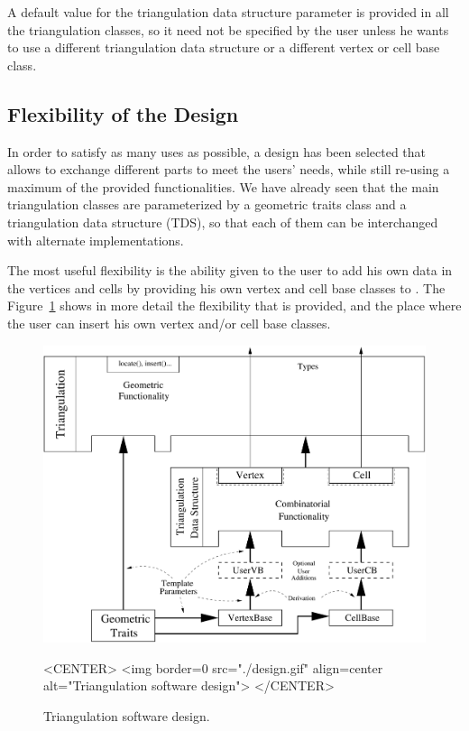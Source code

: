 A default value for the triangulation data structure parameter is provided in
all the triangulation classes, so it need not be specified by the user unless
he wants to use a different triangulation data structure or a different vertex
or cell base class.

\subsection{Flexibility of the Design}

In order to satisfy as many uses as possible, a design has been selected that
allows to exchange different parts to meet the users' needs, while still
re-using a maximum of the provided functionalities.  We have already seen that
the main triangulation classes are parameterized by a geometric traits class
and a triangulation data structure (TDS), so that each of them can be
interchanged with alternate implementations.

The most useful flexibility is the ability given to the user to add his own
data in the vertices and cells by providing his own vertex and cell base
classes to .  The
Figure~\ref{T3-fig-layers} shows in more detail the flexibility that is
provided, and the place where the user can insert his own vertex and/or cell
base classes.

\begin{figure}[htbp]
\begin{ccTexOnly}
\begin{center}
\includegraphics[width=13cm]{Triangulation_3/design}
\end{center}
\end{ccTexOnly}
\caption{Triangulation software design.
\label{T3-fig-layers}}
\begin{ccHtmlOnly}
<CENTER>
<img border=0 src="./design.gif" align=center
 alt="Triangulation software design">
</CENTER>
\end{ccHtmlOnly}
\end{figure}

